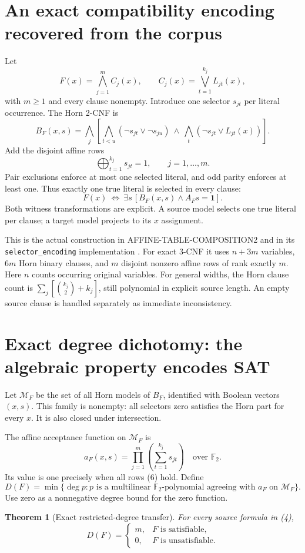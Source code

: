 \documentclass[11pt]{article}
\newtheorem{theorem}{Theorem}
\newcommand{\F}{\mathbb F_2}
\begin{document}
\section{An exact compatibility encoding recovered from the corpus}
Let
\[
 F(x)=\bigwedge_{j=1}^m C_j(x),\qquad
 C_j(x)=\bigvee_{t=1}^{k_j}L_{jt}(x),
 \tag{4}
\]
with $m\ge1$ and every clause nonempty.
Introduce one selector $s_{jt}$ per literal occurrence.
The Horn 2-CNF is
\[
 B_F(x,s)=
 \bigwedge_j
 \left[
 \bigwedge_{t<u}(\neg s_{jt}\vee\neg s_{ju})
 \ \wedge\
 \bigwedge_t(\neg s_{jt}\vee L_{jt}(x))
 \right].
 \tag{5}
\]
Add the disjoint affine rows
\[
 \bigoplus_{t=1}^{k_j}s_{jt}=1,\qquad j=1,\ldots,m.
 \tag{6}
\]
Pair exclusions enforce at most one selected literal, and odd parity
enforces at least one. Thus exactly one true literal is selected in
every clause:
\[
 \boxed{
 F(x)\ \Longleftrightarrow\
 \exists s\,[B_F(x,s)\wedge A_Fs=\mathbf1].
 }
 \tag{7}
\]
Both witness transformations are explicit. A source model selects one
true literal per clause; a target model projects to its $x$ assignment.

This is the actual construction in AFFINE-TABLE-COMPOSITION2 and in its
\texttt{selector\_encoding} implementation \cite{atc2026,atccode2026}.
For exact 3-CNF it uses $n+3m$ variables, $6m$ Horn binary clauses,
and $m$ disjoint nonzero affine rows of rank exactly $m$.
Here $n$ counts occurring original variables.
For general widths, the Horn clause count is
$\sum_j[\binom{k_j}{2}+k_j]$, still polynomial in explicit source length.
An empty source clause is handled separately as immediate inconsistency.

\section{Exact degree dichotomy: the algebraic property encodes SAT}
Let $\mathcal M_F$ be the set of all Horn models of $B_F$,
identified with Boolean vectors $(x,s)$. This family is nonempty:
all selectors zero satisfies the Horn part for every $x$.
It is also closed under intersection.

The affine acceptance function on $\mathcal M_F$ is
\[
 a_F(x,s)=
 \prod_{j=1}^m\left(\sum_{t=1}^{k_j}s_{jt}\right)
 \quad\text{over }\F.
 \tag{8}
\]
Its value is one precisely when all rows (6) hold.
Define
\[
 D(F)=\min\{\deg p:
 p\text{ is a multilinear }\F\text{-polynomial agreeing with }
 a_F\text{ on }\mathcal M_F\}.
 \tag{9}
\]
Use zero as a nonnegative degree bound for the zero function.

\begin{theorem}[Exact restricted-degree transfer]\label{thm:degree}
For every source formula in (4),
\[
 \boxed{
 D(F)=
 \begin{cases}
  m,& F\text{ is satisfiable},\\
  0,& F\text{ is unsatisfiable}.
 \end{cases}}
 \tag{10}
\]
\end{theorem}
\end{document}
